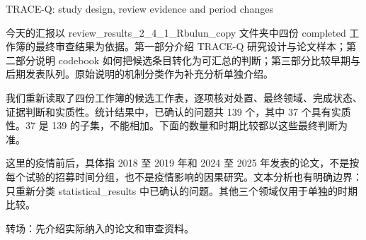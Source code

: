 \documentclass[10pt,aspectratio=169]{beamer}
\begin{document}
\begin{frame}[t]{TRACE-Q: study design, review evidence and period changes}
{今天的汇报以 review\_results\_2\_4\_1\_Rbulun\_copy 文件夹中四份 completed 工作簿的最终审查结果为依据。第一部分介绍 TRACE-Q 研究设计与论文样本；第二部分说明 codebook 如何把候选条目转化为可汇总的判断；第三部分比较早期与后期发表队列。原始说明的机制分类作为补充分析单独介绍。
\par
我们重新读取了四份工作簿的候选工作表，逐项核对处置、最终领域、完成状态、证据判断和实质性。统计结果中，已确认的问题共 139 个，其中 37 个具有实质性。37 是 139 的子集，不能相加。下面的数量和时期比较都以这些最终判断为准。
\par
这里的疫情前后，具体指 2018 至 2019 年和 2024 至 2025 年发表的论文，不是按每个试验的招募时间分组，也不是疫情影响的因果研究。文本分析也有明确边界：只重新分类 statistical\_results 中已确认的问题。其他三个领域仅用于单独的时期比较。
\par
转场：先介绍实际纳入的论文和审查资料。
}
\end{frame}
\end{document}
